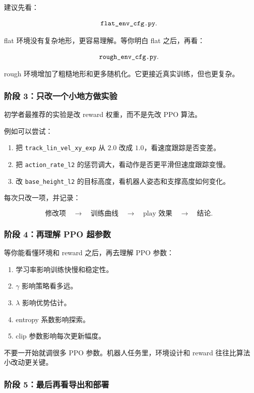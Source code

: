 \documentclass[UTF8,11pt,a4paper]{ctexart}
\begin{document}
建议先看：

\[
\text{\texttt{flat\_env\_cfg.py}}.
\]

flat 环境没有复杂地形，更容易理解。等你明白 flat 之后，再看：

\[
\text{\texttt{rough\_env\_cfg.py}}.
\]

rough 环境增加了粗糙地形和更多随机化。它更接近真实训练，但也更复杂。

\subsubsection{阶段 3：只改一个小地方做实验}

初学者最推荐的实验是改 reward 权重，而不是先改 PPO 算法。

例如可以尝试：

\begin{enumerate}
  \item 把 \texttt{track\_lin\_vel\_xy\_exp} 从 \(2.0\) 改成 \(1.0\)，看速度跟踪是否变差。
  \item 把 \texttt{action\_rate\_l2} 的惩罚调大，看动作是否更平滑但速度跟踪变慢。
  \item 改 \texttt{base\_height\_l2} 的目标高度，看机器人姿态和支撑高度如何变化。
\end{enumerate}

每次只改一项，并记录：

\[
\text{修改项}
\quad
\rightarrow
\quad
\text{训练曲线}
\quad
\rightarrow
\quad
\text{play 效果}
\quad
\rightarrow
\quad
\text{结论}.
\]

\subsubsection{阶段 4：再理解 PPO 超参数}

等你能看懂环境和 reward 之后，再去理解 PPO 参数：

\begin{enumerate}
  \item 学习率影响训练快慢和稳定性。
  \item \(\gamma\) 影响策略看多远。
  \item \(\lambda\) 影响优势估计。
  \item entropy 系数影响探索。
  \item clip 参数影响每次更新幅度。
\end{enumerate}

不要一开始就调很多 PPO 参数。机器人任务里，环境设计和 reward 往往比算法小改动更关键。

\subsubsection{阶段 5：最后再看导出和部署}
\end{document}
